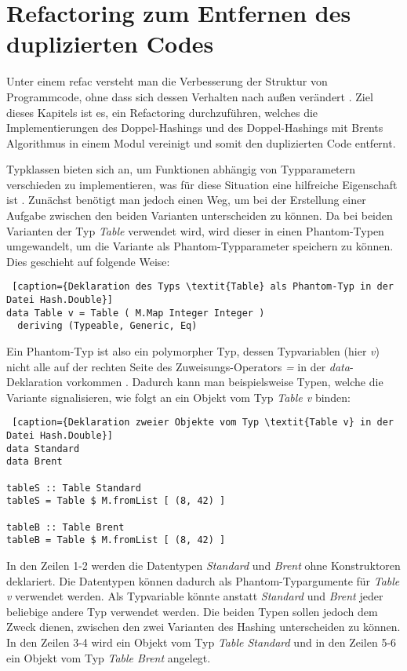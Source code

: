 \section{Refactoring zum Entfernen des duplizierten Codes}
Unter einem \Gls{refac} versteht man die Verbesserung der Struktur von Programmcode, ohne dass sich dessen Verhalten nach außen verändert \cite[Preface]{refactoring}. Ziel dieses Kapitels ist es, ein Refactoring durchzuführen, welches die Implementierungen des Doppel-Hashings und des Doppel-Hashings mit Brents Algorithmus in einem Modul vereinigt und somit den duplizierten Code entfernt. 

Typklassen bieten sich an, um Funktionen abhängig von Typparametern verschieden zu implementieren, was für diese Situation eine hilfreiche Eigenschaft ist \cite[ch.~6]{HArealw}. Zunächst benötigt man jedoch einen Weg, um bei der Erstellung einer Aufgabe zwischen den beiden Varianten unterscheiden zu können. Da bei beiden Varianten der Typ \textit{Table} verwendet wird, wird dieser in einen Phantom-Typen umgewandelt, um die Variante als Phantom-Typparameter speichern zu können. Dies geschieht auf folgende Weise:
\begin{lstlisting} [caption={Deklaration des Typs \textit{Table} als Phantom-Typ in der Datei Hash.Double}]
data Table v = Table ( M.Map Integer Integer )
  deriving (Typeable, Generic, Eq)
\end{lstlisting}
Ein Phantom-Typ ist also ein polymorpher Typ, dessen Typvariablen (hier \textit{v}) nicht alle auf der rechten Seite des Zuweisungs-Operators \textit{=} in der \textit{data}-Deklaration vorkommen \cite{phantom}. 
\newpage
Dadurch kann man beispielsweise Typen, welche die Variante signalisieren, wie folgt an ein Objekt vom Typ \textit{Table v} binden:
\begin{lstlisting} [caption={Deklaration zweier Objekte vom Typ \textit{Table v} in der Datei Hash.Double}]
data Standard
data Brent

tableS :: Table Standard
tableS = Table $ M.fromList [ (8, 42) ]

tableB :: Table Brent
tableB = Table $ M.fromList [ (8, 42) ]
\end{lstlisting}
In den Zeilen 1-2 werden die Datentypen \textit{Standard} und \textit{Brent} ohne Konstruktoren deklariert. Die Datentypen können dadurch als Phantom-Typargumente für \textit{Table v} verwendet werden. Als Typvariable könnte anstatt \textit{Standard} und \textit{Brent} jeder beliebige andere Typ verwendet werden. Die beiden Typen sollen jedoch dem Zweck dienen, zwischen den zwei Varianten des Hashing unterscheiden zu können. In den Zeilen 3-4 wird ein Objekt vom Typ \textit{Table Standard} und in den Zeilen 5-6 ein Objekt vom Typ \textit{Table Brent} angelegt.

